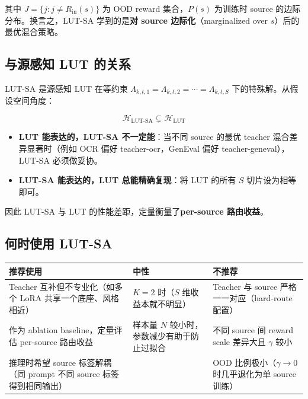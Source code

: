\documentclass[11pt,a4paper]{article}
\begin{document}
其中 $J = \{j : j \neq R_{\text{in}}(s)\}$ 为 OOD reward 集合，$P(s)$ 为训练时 source 的边际分布。换言之，LUT-SA 学到的是\textbf{对 source 边际化}（marginalized over $s$）后的最优混合策略。

\subsection{与源感知 LUT 的关系}

LUT-SA 是源感知 LUT 在等约束 $\Lambda_{k,t,1} = \Lambda_{k,t,2} = \cdots = \Lambda_{k,t,S}$ 下的特殊解。从假设空间角度：

\begin{equation}
\mathcal{H}_{\text{LUT-SA}} \subsetneq \mathcal{H}_{\text{LUT}}
\end{equation}

\begin{itemize}
    \item \textbf{LUT 能表达的，LUT-SA 不一定能}：当不同 source 的最优 teacher 混合差异显著时（例如 OCR 偏好 teacher-ocr，GenEval 偏好 teacher-geneval），LUT-SA 必须做妥协。
    \item \textbf{LUT-SA 能表达的，LUT 总能精确复现}：将 LUT 的所有 $S$ 切片设为相等即可。
\end{itemize}

因此 LUT-SA 与 LUT 的性能差距，定量衡量了\textbf{per-source 路由收益}。

\subsection{何时使用 LUT-SA}

\begin{center}
\small
\begin{tabular}{p{4.2cm}|p{4.2cm}|p{4.2cm}}
\toprule
\textbf{推荐使用} & \textbf{中性} & \textbf{不推荐} \\
\midrule
Teacher 互补但不专业化（如多个 LoRA 共享一个底座、风格相近）&
$K = 2$ 时（$S$ 维收益本就不明显）&
Teacher 与 source 严格一一对应（hard-route 配置） \\
\midrule
作为 ablation baseline，定量评估 per-source 路由收益 &
样本量 $N$ 较小时，参数减少有助于防止过拟合 &
不同 source 间 reward scale 差异大且 $\gamma$ 较小 \\
\midrule
推理时希望 source 标签解耦（同 prompt 不同 source 标签得到相同输出）&
& OOD 比例极小（$\gamma \to 0$ 时几乎退化为单 source 训练） \\
\bottomrule
\end{tabular}
\end{center}
\end{document}
